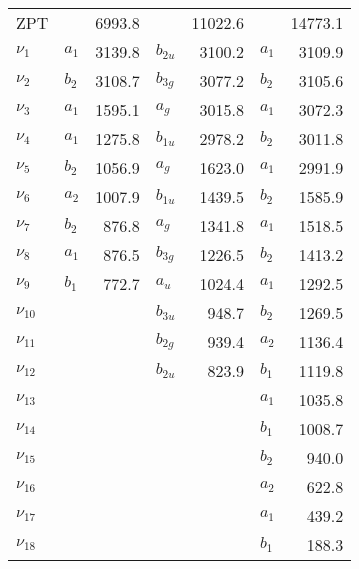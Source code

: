 \begin{table}
\begin{tabular}{llrlrlr}
\hline
ZPT &          &   6993.8 &          &  11022.6 &          &  14773.1 \\
$\nu_{1 }$ & $   a_1$ &   3139.8 & $b_{2u}$ &   3100.2 & $   a_1$ &   3109.9 \\
$\nu_{2 }$ & $   b_2$ &   3108.7 & $b_{3g}$ &   3077.2 & $   b_2$ &   3105.6 \\
$\nu_{3 }$ & $   a_1$ &   1595.1 & $   a_g$ &   3015.8 & $   a_1$ &   3072.3 \\
$\nu_{4 }$ & $   a_1$ &   1275.8 & $b_{1u}$ &   2978.2 & $   b_2$ &   3011.8 \\
$\nu_{5 }$ & $   b_2$ &   1056.9 & $   a_g$ &   1623.0 & $   a_1$ &   2991.9 \\
$\nu_{6 }$ & $   a_2$ &   1007.9 & $b_{1u}$ &   1439.5 & $   b_2$ &   1585.9 \\
$\nu_{7 }$ & $   b_2$ &    876.8 & $   a_g$ &   1341.8 & $   a_1$ &   1518.5 \\
$\nu_{8 }$ & $   a_1$ &    876.5 & $b_{3g}$ &   1226.5 & $   b_2$ &   1413.2 \\
$\nu_{9 }$ & $   b_1$ &    772.7 & $   a_u$ &   1024.4 & $   a_1$ &   1292.5 \\
$\nu_{10}$ &          &          & $b_{3u}$ &    948.7 & $   b_2$ &   1269.5 \\
$\nu_{11}$ &          &          & $b_{2g}$ &    939.4 & $   a_2$ &   1136.4 \\
$\nu_{12}$ &          &          & $b_{2u}$ &    823.9 & $   b_1$ &   1119.8 \\
$\nu_{13}$ &          &          &          &          & $   a_1$ &   1035.8 \\
$\nu_{14}$ &          &          &          &          & $   b_1$ &   1008.7 \\
$\nu_{15}$ &          &          &          &          & $   b_2$ &    940.0 \\
$\nu_{16}$ &          &          &          &          & $   a_2$ &    622.8 \\
$\nu_{17}$ &          &          &          &          & $   a_1$ &    439.2 \\
$\nu_{18}$ &          &          &          &          & $   b_1$ &    188.3 \\
\end{tabular}
\end{table}
